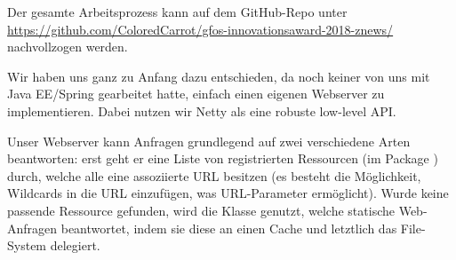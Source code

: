 Der gesamte Arbeitsprozess kann auf dem GitHub-Repo unter
\url{https://github.com/ColoredCarrot/gfos-innovationsaward-2018-znews/}
nachvollzogen werden.

Wir haben uns ganz zu Anfang dazu entschieden,
da noch keiner von uns mit Java EE/Spring gearbeitet hatte,
einfach einen eigenen Webserver zu implementieren.
Dabei nutzen wir Netty als eine robuste low-level API.

Unser Webserver kann Anfragen grundlegend auf zwei verschiedene Arten beantworten:
erst geht er eine Liste von registrierten Ressourcen
(im Package )
durch,
welche alle eine assoziierte URL besitzen
(es besteht die Möglichkeit,
Wildcards in die URL einzufügen,
was URL-Parameter ermöglicht).
Wurde keine passende Ressource gefunden,
wird die Klasse  genutzt,
welche statische Web-Anfragen beantwortet,
indem sie diese an einen Cache und letztlich das File-System delegiert.


